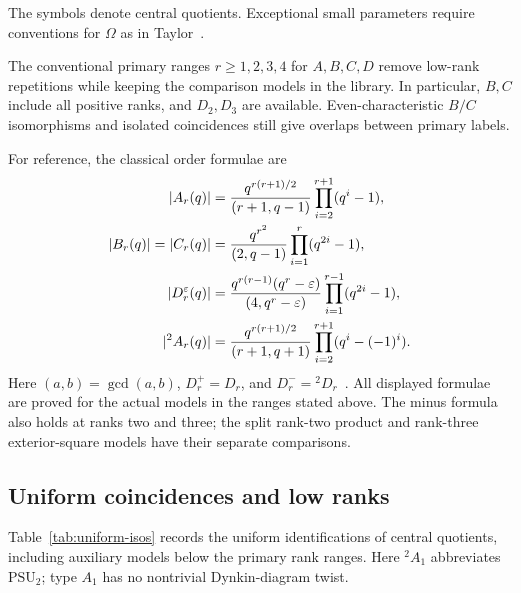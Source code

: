 \documentclass[11pt]{article}
\numberwithin{equation}{section}
\theoremstyle{definition}
\newcommand{\PSU}{\mathrm{PSU}}
\begin{document}
The symbols denote central quotients. Exceptional small parameters
require conventions for $\Omega$ as in
Taylor~\cite[Chapters~8, 10--12]{Taylor}.

The conventional primary ranges $r\geq1,2,3,4$ for $A,B,C,D$ remove
low-rank repetitions while keeping the comparison models in the
library. In particular, $B,C$ include all positive ranks, and $D_2,D_3$
are available. Even-characteristic $B/C$ isomorphisms and isolated
coincidences still give overlaps between primary labels.

For reference, the classical order formulae are
\begin{align}
 |A_r(q)|&=\frac{q^{r(r+1)/2}}{(r+1,q-1)}
             \prod_{i=2}^{r+1}(q^i-1),\notag\\
 |B_r(q)|=|C_r(q)|&=\frac{q^{r^2}}{(2,q-1)}
             \prod_{i=1}^{r}(q^{2i}-1),\label{eq:bcorder}\\
 |D_r^{\varepsilon}(q)|&=
       \frac{q^{r(r-1)}(q^r-\varepsilon)}{(4,q^r-\varepsilon)}
             \prod_{i=1}^{r-1}(q^{2i}-1),\label{eq:dorder}\\
 |{}^2A_r(q)|&=\frac{q^{r(r+1)/2}}{(r+1,q+1)}
             \prod_{i=2}^{r+1}(q^i-(-1)^i).\notag
\end{align}
Here $(a,b)=\gcd(a,b)$, $D_r^+=D_r$, and
$D_r^-={}^2D_r$~\cite{Taylor,Wilson}. All displayed formulae are proved
for the actual models in the ranges stated above. The minus formula
also holds at ranks two and three; the split rank-two product and
rank-three exterior-square models have their separate comparisons.

\subsection{Uniform coincidences and low ranks}

Table~\ref{tab:uniform-isos} records the uniform identifications of
central quotients, including auxiliary models below the primary rank
ranges. Here $ {}^2A_1$ abbreviates $\PSU_2$; type $A_1$ has no
nontrivial Dynkin-diagram twist.
\end{document}
